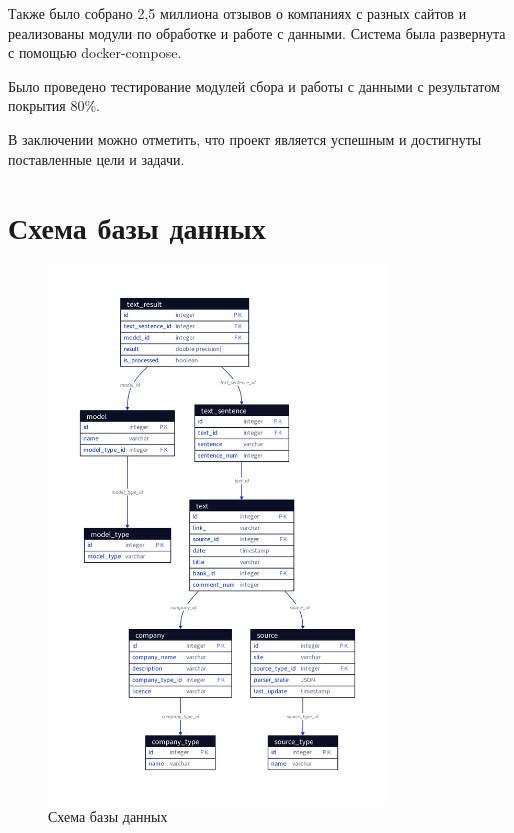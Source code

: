 \documentclass[PI, VKR]{HSEUniversity}
\begin{document}
Также было собрано 2,5 миллиона отзывов о компаниях с разных сайтов и реализованы модули по обработке и работе с данными. Система была развернута с помощью docker-compose.

Было проведено тестирование модулей сбора и работы с данными с результатом покрытия 80\%.

В заключении можно отметить, что проект является успешным и достигнуты поставленные цели и задачи.

\putbibliography
\appendix

\chapter{Схема базы данных}
\label{sec:org3c996ea}
\begin{figure}[h!]
\centering
\includegraphics[width=0.8\textwidth]{img/d2/database.png}
\caption{\label{fig:database}Схема базы данных}
\end{figure}
\end{document}
